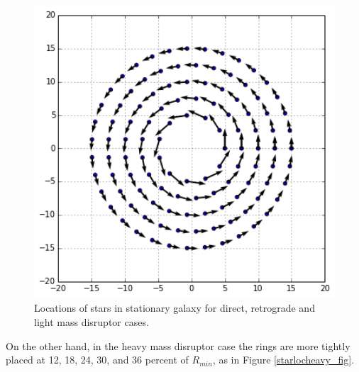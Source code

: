 \documentclass[11pt]{article}
\begin{document}
\begin{figure}[h!]
\centering
\includegraphics[width=5in]{../DirectPassageImage.png}
\caption{Locations of stars in stationary galaxy for direct, retrograde and light mass disruptor cases.}
\label{starlocdirect_fig}
\end{figure}

On the other hand, in the heavy mass disruptor case the rings are more tightly placed at 12, 18, 24, 30, and 36 percent of $R_{min}$, as in Figure \ref{starlocheavy_fig}.
\end{document}
